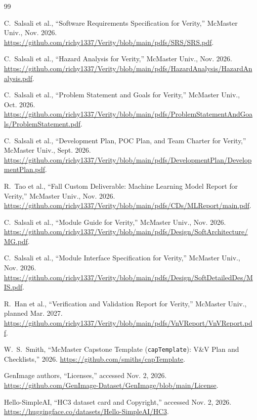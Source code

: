 \documentclass[12pt, titlepage]{article}
\begin{document}
\begingroup\small
\begin{thebibliography}{99}
\setlength{\itemsep}{0.5pt}

C.~Salsali et al., ``Software Requirements Specification for Verity,'' McMaster Univ., Nov. 2026. \url{https://github.com/richy1337/Verity/blob/main/pdfs/SRS/SRS.pdf}.

C.~Salsali et al., ``Hazard Analysis for Verity,'' McMaster Univ., Nov. 2026. \url{https://github.com/richy1337/Verity/blob/main/pdfs/HazardAnalysis/HazardAnalysis.pdf}.

C.~Salsali et al., ``Problem Statement and Goals for Verity,'' McMaster Univ., Oct. 2026. \url{https://github.com/richy1337/Verity/blob/main/pdfs/ProblemStatementAndGoals/ProblemStatement.pdf}.

C.~Salsali et al., ``Development Plan, POC Plan, and Team Charter for Verity,'' McMaster Univ., Sept. 2026. \url{https://github.com/richy1337/Verity/blob/main/pdfs/DevelopmentPlan/DevelopmentPlan.pdf}.

R.~Tao et al., ``Fall Custom Deliverable: Machine Learning Model Report for Verity,'' McMaster Univ., Nov. 2026. \url{https://github.com/richy1337/Verity/blob/main/pdfs/CDs/MLReport/main.pdf}.

C.~Salsali et al., ``Module Guide for Verity,'' McMaster Univ., Nov. 2026. \url{https://github.com/richy1337/Verity/blob/main/pdfs/Design/SoftArchitecture/MG.pdf}.

C.~Salsali et al., ``Module Interface Specification for Verity,'' McMaster Univ., Nov. 2026. \url{https://github.com/richy1337/Verity/blob/main/pdfs/Design/SoftDetailedDes/MIS.pdf}.

R.~Han et al., ``Verification and Validation Report for Verity,'' McMaster Univ., planned Mar. 2027. \url{https://github.com/richy1337/Verity/blob/main/pdfs/VnVReport/VnVReport.pdf}.

W.~S.~Smith, ``McMaster Capstone Template (\texttt{capTemplate}): V\&V Plan and Checklists,'' 2026. \url{https://github.com/smiths/capTemplate}.

GenImage authors, ``Licenses,'' accessed Nov. 2, 2026. \url{https://github.com/GenImage-Dataset/GenImage/blob/main/License}.

Hello-SimpleAI, ``HC3 dataset card and Copyright,'' accessed Nov. 2, 2026. \url{https://huggingface.co/datasets/Hello-SimpleAI/HC3}.


\end{thebibliography}
\end{document}
